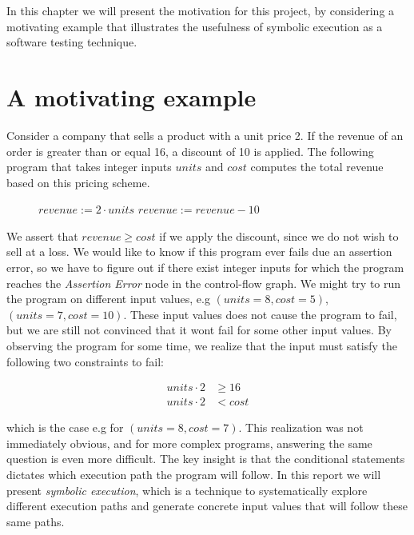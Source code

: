 In this chapter we will present the motivation for this project, by considering a motivating example that illustrates the usefulness of symbolic execution as a software testing technique.

\section{A motivating example}
Consider a company that sells a product with a unit price 2. If the revenue of an order is greater than or equal 16, a discount of 10 is applied. The following program that takes integer inputs $units$ and $cost$ computes the total revenue based on this pricing scheme. 


\begin{figure}[!h]
	\begin{algorithmic}
		\State $revenue := 2\cdot units$
		\State $revenue := revenue - 10$
		\EndIf
		\State {}
		\EndProcedure
	\end{algorithmic}
\end{figure}

\motexample

\newpage

We assert that $revenue \geq cost$ if we apply the discount, since we do not wish to sell at a loss. 
We would like to know if this program ever fails due an assertion error, so we have to figure out if there exist integer inputs for which the program reaches the \textsl{Assertion Error} node in the control-flow graph. 
We might try to run the program on different input values, e.g $(units = 8, cost = 5)$, $(units = 7, cost = 10)$. These input values does not cause the program to fail, but we are still not convinced that it wont fail for some other input values.
By observing the program for some time, we realize that the input must satisfy the following two constraints to fail:

\begin{align*}
	 units \cdot 2 & \geq 16\\
	 units \cdot 2 & < cost
\end{align*}

which is the case e.g for $(units = 8, cost = 7)$. This realization was not immediately obvious, and for more complex programs, answering the same question is even more difficult. The key insight is that the conditional statements dictates which execution path the program will follow. In this report we will present \emph{symbolic execution}, which is a technique to systematically explore different execution paths and generate concrete input values that will follow these same paths. 